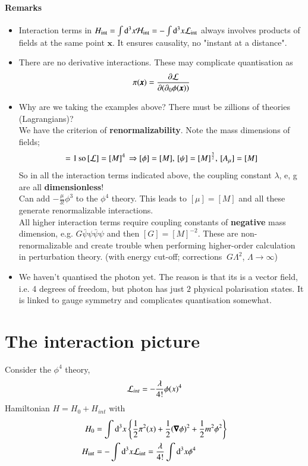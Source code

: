 \paragraph{Remarks}
\begin{itemize}
	\item Interaction terms in $H_\text{int} = \int \dd^3x \mathcal{H}_\text{int} = - \int\dd^3x\mathcal{L}_\text{int}$ always involves products of fields at the same point $\pmb{x}$. It ensures causality, no "instant at a distance".
	\item There are no derivative interactions. These may complicate quantisation as $$\pi(\pmb{x}) = \frac{\partial\mathcal{L}}{\partial(\partial_0 \phi(\pmb{x}))}$$
	\item Why are we taking the examples above? There must be zillions of theories (Lagrangians)? \\
			We have the criterion of \textbf{renormalizability}. Note the mass dimensions of fields;
			\begin{align*}
				[S] = 1 \, \text{so} \, [\lag] = [M]^4 \, \Rightarrow [\phi] = [M] ,\, [\psi] = [M]^{\frac{3}{2}} ,\, [A_\mu] = [M]
			\end{align*}
			So in all the interaction terms indicated above, the coupling constant $\lambda$, e, g are all \textbf{dimensionless}!\\
			Can add $-\frac{\mu}{3!}\phi^3$ to the $\phi^4$ theory. This leads to $[\mu] = [M]$ and all these generate renormalizable interactions. \\
			All higher interaction terms require coupling constants of \textbf{negative} mass dimension, e.g. $G\bar{\psi}\psi\bar{\psi}\psi$ and then $[G] = [M]^{-2}$. These are non-renormalizable and create trouble when performing higher-order calculation in perturbation theory.
			(with energy cut-off; corrections $~G\Lambda^2$, $\Lambda \rightarrow \infty$)
		\item We haven't quantised the photon yet. The reason is that its is a vector field, i.e. 4 degrees of freedom, but photon has just $2$ physical polarisation states. It is linked to gauge symmetry and complicates quantisation somewhat.
\end{itemize}
\section{The interaction picture}
Consider the $\phi^4$ theory, 
\begin{align}
\mathcal{L}_{int} = -\frac{\lambda}{4!} \phi(x)^4
\end{align}
Hamiltonian $H = H_0 + H_{int}$ with 
\begin{align}
	H_0 &= \int\dd^3 x \left\{ \frac{1}{2}\pi^2(x) + \frac{1}{2}(\pmb{\nabla}\phi)^2 + \frac{1}{2}m^2\phi^2 \right\}\\
	H_\text{int} &= -\int\dd^3x \mathcal{L}_\text{int} = \frac{\lambda}{4!}\int\dd^3x \phi^4 
\end{align}

